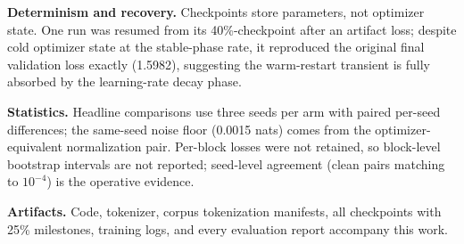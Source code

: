 \documentclass[letterpaper]{article} %
\begin{document}
\textbf{Determinism and recovery.} Checkpoints store parameters, not
optimizer state. One run was resumed from its 40\%-checkpoint after an
artifact loss; despite cold optimizer state at the stable-phase rate, it
reproduced the original final validation loss exactly (1.5982),
suggesting the warm-restart transient is fully absorbed by the
learning-rate decay phase.

\textbf{Statistics.} Headline comparisons use three seeds per arm with
paired per-seed differences; the same-seed noise floor (0.0015 nats) comes
from the optimizer-equivalent normalization pair. Per-block losses were
not retained, so block-level bootstrap intervals are not reported;
seed-level agreement (clean pairs matching to $10^{-4}$) is the operative
evidence.

\textbf{Artifacts.} Code, tokenizer, corpus tokenization manifests, all
checkpoints with 25\% milestones, training logs, and every evaluation
report accompany this work.


\end{document}
